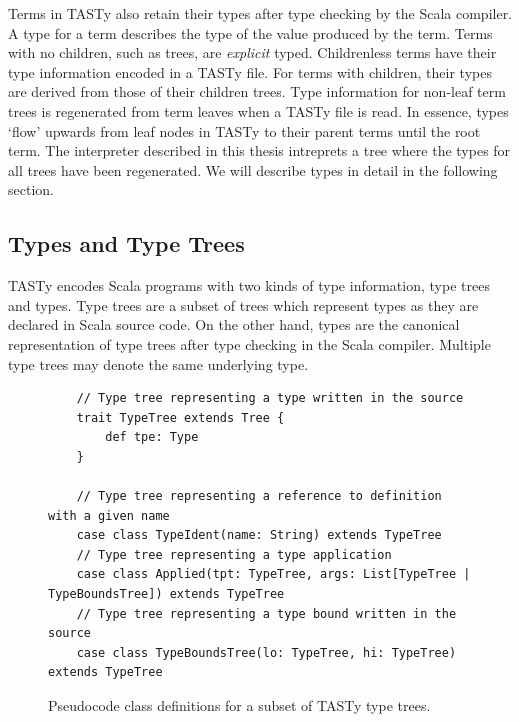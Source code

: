 Terms in TASTy also retain their types after type checking by the Scala compiler.
A type for a term describes the type of the value produced by the term.
Terms with no children, such as  trees, are \textit{explicit} typed.
Childrenless terms have their type information encoded in a TASTy file.  
For terms with children, their types are derived from those of their children trees.
Type information for non-leaf term trees is regenerated from term leaves when a TASTy file is read.
In essence, types `flow' upwards from leaf nodes in TASTy to their parent terms until the root term.
The interpreter described in this thesis intreprets a tree where the types for all trees have been regenerated.
We will describe types in detail in the following section.

\subsection{Types and Type Trees}

TASTy encodes Scala programs with two kinds of type information, type trees and types.
Type trees are a subset of trees which represent types as they are declared in Scala source code.
On the other hand, types are the canonical representation of type trees after type checking in the Scala compiler.
Multiple type trees may denote the same underlying type.

\begin{figure}[!htb]
	\begin{verbatim}
	// Type tree representing a type written in the source
	trait TypeTree extends Tree {
		def tpe: Type
	}
	
	// Type tree representing a reference to definition with a given name
	case class TypeIdent(name: String) extends TypeTree 
	// Type tree representing a type application
	case class Applied(tpt: TypeTree, args: List[TypeTree | TypeBoundsTree]) extends TypeTree
	// Type tree representing a type bound written in the source
	case class TypeBoundsTree(lo: TypeTree, hi: TypeTree) extends TypeTree
	\end{verbatim} 
	\caption{Pseudocode class definitions for a subset of TASTy type trees.}
	\label{tasty:type-trees}
\end{figure}

